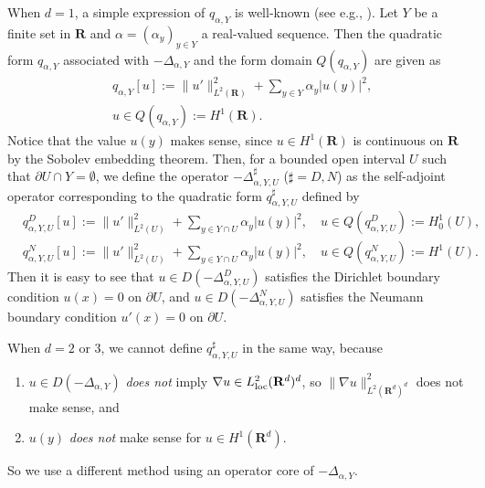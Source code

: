\documentclass[12pt,a4paper]{article}
\begin{document}
When $d=1$, a simple expression of $q_{\alpha,Y}$ is 
well-known
(see e.g., \cite[page 79]{Al-Ge-Ho-Ho}).
Let $Y$ be a finite set in $\mathbf{R}$ and
$\alpha=(\alpha_y)_{y\in Y}$  a real-valued sequence.
Then the quadratic form $q_{\alpha,Y}$ associated with $-\Delta_{\alpha,Y}$
and the form domain $Q(q_{\alpha,Y})$ are given as
\begin{align*}
& q_{\alpha,Y}[u]:=\|u'\|^2_{L^2(\mathbf{R})}+\sum_{y\in Y}\alpha_y|u(y)|^2,
\\
&u\in Q(q_{\alpha,Y}):=H^1(\mathbf{R}).
\end{align*}
Notice that the value $u(y)$ makes sense,
since $u\in H^1(\mathbf{R})$ is continuous on $\mathbf{R}$
by the Sobolev embedding theorem.
Then, for a bounded open interval $U$ such that
$\partial U\cap Y=\emptyset$,
we define the operator $-\Delta^\sharp_{\alpha,Y,U}$ ($\sharp=D,N$) as
the self-adjoint operator corresponding to the quadratic form
$q^\sharp_{\alpha,Y,U}$ defined by
\begin{align*}
& q^D_{\alpha,Y,U}[u]:=
\|u'\|^2_{L^2(U)}+\sum_{y\in Y\cap U}\alpha_y|u(y)|^2,
\quad
u\in Q(q^D_{\alpha,Y,U}):=H^1_0(U),\\
& q^N_{\alpha,Y,U}[u]:=
\|u'\|^2_{L^2(U)}+\sum_{y\in Y\cap U}\alpha_y|u(y)|^2,
\quad
u\in Q(q^N_{\alpha,Y,U}):=H^1(U).
\end{align*}
Then it is easy to see that
$u\in D(-\Delta^D_{\alpha,Y,U})$ satisfies
the Dirichlet boundary condition $u(x)=0$ on $\partial U$,
and
$u\in D(-\Delta^N_{\alpha,Y,U})$ satisfies
the Neumann boundary condition $u'(x)=0$ on $\partial U$.


When $d=2$ or $3$,
we cannot define $q^\sharp_{\alpha,Y,U}$ in the same way,
because
\begin{enumerate}
 \item[(i)]
$u\in D(-\Delta_{\alpha,Y})$ \textit{does not} imply
$\nabla u\in L^2_{\rm loc}(\mathbf{R}^d)^d$,
so $\|\nabla u\|_{L^2(\mathbf{R}^d)^d}^2$ 
does not make sense, and

 \item[(ii)] $u(y)$ \textit{does not} make sense
for $u\in H^1(\mathbf{R}^d)$.
\end{enumerate}
So we use a different method using an operator core of $-\Delta_{\alpha,Y}$.
\end{document}
